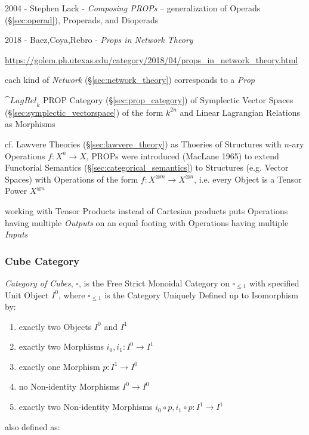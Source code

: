2004 - Stephen Lack - \emph{Composing PROPs} -- generalization of Operads
(\S\ref{sec:operad}), Properads, and Dioperads

2018 - Baez,Coya,Rebro - \emph{Props in Network Theory}

\url{https://golem.ph.utexas.edu/category/2018/04/props_in_network_theory.html}

each kind of \emph{Network} (\S\ref{sec:network_theory}) corresponds to a
\emph{Prop}

$\cat{LagRel}_k$ PROP Category (\S\ref{sec:prop_category}) of Symplectic Vector
Spaces (\S\ref{sec:symplectic_vectorspace}) of the form $k^{2n}$ and Linear
Lagrangian Relations as Morphisms

\fist cf. Lawvere Theories (\S\ref{sec:lawvere_theory}) as Thoeries of
Structures with $n$-ary Operations $f : X^n \rightarrow X$, PROPs were
introduced (MacLane 1965) to extend Functorial Semantics
(\S\ref{sec:categorical_semantics}) to Structures (e.g. Vector Spaces) with
Operations of the form $f : X^{\otimes m} \rightarrow X^{\otimes n}$, i.e.
every Object is a Tensor Power $X^{\otimes n}$

working with Tensor Products instead of Cartesian products puts Operations
having multiple \emph{Outputs} on an equal footing with Operations having
multiple \emph{Inputs}



\subsubsection{Cube Category}\label{sec:cube_category}

\emph{Category of Cubes}, $\square$, is the Free Strict Monoidal
Category on $\square_{\leq 1}$ with specified Unit Object $I^0$, where
$\square_{\leq 1}$ is the Category Uniquely Defined up to Isomorphism
by:
\begin{enumerate}
  \item exactly two Objects $I^0$ and $I^1$
  \item exactly two Morphisms $i_0, i_1 : I^0 \rightarrow I^1$
  \item exactly one Morphism $p : I^1 \rightarrow I^0$
  \item no Non-identity Morphisms $I^0 \rightarrow I^0$
  \item exactly two Non-identity Morphisms
    $i_0 \circ p, i_1 \circ p : I^1 \rightarrow I^1$
\end{enumerate}

also defined as:

